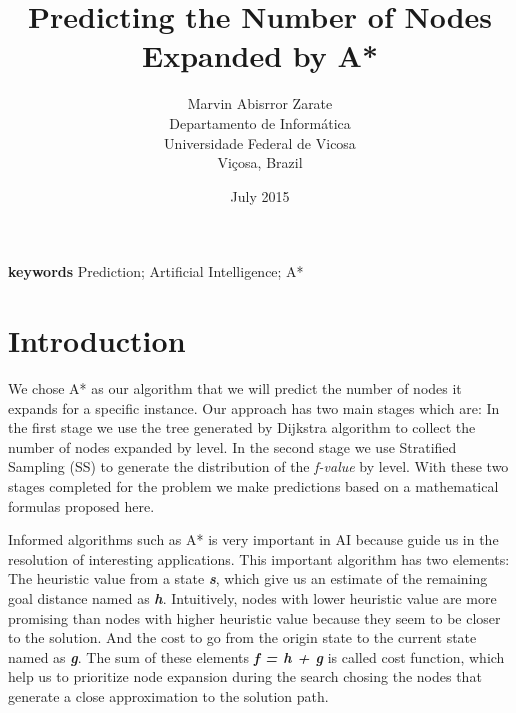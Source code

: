 \documentclass[11pt,a4paper,oneside]{report}
\begin{document}
\title{Predicting the Number of Nodes Expanded by A*}
\providecommand{\keywords}[1]{\textbf{keywords} #1}
\author{Marvin Abisrror Zarate\\ Departamento de Informática \\Universidade Federal de Vicosa \\Viçosa, Brazil}

\date{\color{black}July 2015}
\maketitle


\keywords{Prediction; Artificial Intelligence; A*}
\section{Introduction}
\label{sec:1}
We chose A* as our algorithm that we will predict the number of nodes it expands for a specific instance. Our approach has two main stages which are: In the first stage we use the tree generated by Dijkstra algorithm to collect the number of nodes expanded by level. In the second stage we use Stratified Sampling (SS) to generate the distribution of the \textit{f-value} by level.  With these two stages completed for the problem we make predictions based on a mathematical formulas proposed here.\newline


Informed algorithms such as A* \citep{hart1968formal} is very important in AI because guide us in the resolution of interesting applications. This important algorithm has two elements: The heuristic value from a state \textbf{\textit{s}}, which give us an estimate of the remaining goal distance named as \textbf{\textit{h}}. Intuitively, nodes with lower heuristic value are more promising than nodes with higher heuristic value because they seem to be closer to the solution.  And the cost to go from the origin state to the current state named as \textbf{\textit{g}}. The sum of these elements \textbf{\textit{f = h + g}} is called cost function, which help us to prioritize node expansion during the search chosing the nodes that generate a close approximation to the solution path.
\newline
\end{document}

